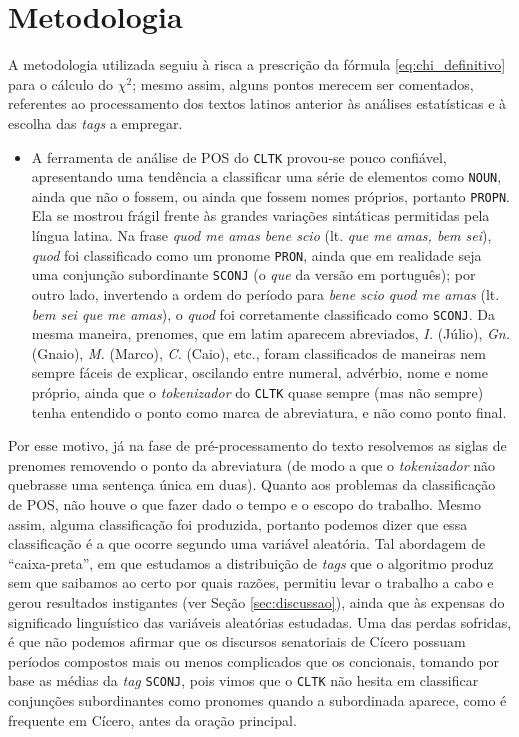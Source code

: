 \documentclass[10pt,a4paper,onecolumn]{article}
\theoremstyle{definition}
\theoremstyle{remark}
\begin{document}
\section{Metodologia}\label{sec:metodologia}
A metodologia utilizada seguiu à risca a prescrição da fórmula \eqref{eq:chi_definitivo} para o cálculo do $\chi^2$; mesmo assim, alguns pontos merecem ser comentados, referentes ao processamento dos textos latinos anterior às análises estatísticas e à escolha das \emph{tags} a empregar.

\begin{itemize}
	\item A ferramenta de análise de POS do \texttt{CLTK} provou-se pouco confiável, apresentando uma tendência a classificar uma série de elementos como \texttt{NOUN}, ainda que não o fossem, ou ainda que fossem nomes próprios, portanto \texttt{PROPN}. Ela se mostrou frágil frente às grandes variações sintáticas permitidas pela língua latina. Na frase \emph{quod me amas bene scio} (lt. \emph{que me amas, bem sei}), \emph{quod} foi classificado como um pronome \texttt{PRON}, ainda que em realidade seja uma conjunção subordinante \texttt{SCONJ} (o \emph{que} da versão em português); por outro lado, invertendo a ordem do período para \emph{bene scio quod me amas} (lt. \emph{bem sei que me amas}), o \emph{quod} foi corretamente classificado como \texttt{SCONJ}. Da mesma maneira, prenomes, que em latim aparecem abreviados, \emph{I.} (Júlio), \emph{Gn.} (Gnaio), \emph{M.} (Marco), \emph{C.} (Caio), etc., foram classificados de maneiras nem sempre fáceis de explicar, oscilando entre numeral, advérbio, nome e nome próprio, ainda que o \emph{tokenizador} do \texttt{CLTK} quase sempre (mas não sempre) tenha entendido o ponto como marca de abreviatura, e não como ponto final.   
\end{itemize}

Por esse motivo, já na fase de pré-processamento do texto resolvemos as siglas de prenomes removendo o ponto da abreviatura (de modo a que o \emph{tokenizador} não quebrasse uma sentença única em duas). Quanto aos problemas da classificação de POS, não houve o que fazer dado o tempo e o escopo do trabalho. Mesmo assim, alguma classificação foi produzida, portanto podemos dizer que essa classificação é a que ocorre segundo uma variável aleatória. Tal abordagem de ``caixa-preta'', em que estudamos a distribuição de \emph{tags} que o algoritmo produz sem que saibamos ao certo por quais razões, permitiu levar o trabalho a cabo e gerou resultados instigantes (ver Seção \ref{sec:discussao}), ainda que às expensas do significado linguístico das variáveis aleatórias estudadas. Uma das perdas sofridas, é que não podemos afirmar que os discursos senatoriais de Cícero possuam períodos compostos mais ou menos complicados que os concionais, tomando por base as médias da \emph{tag} \texttt{SCONJ}, pois vimos que o \texttt{CLTK} não hesita em classificar conjunções subordinantes como pronomes quando a subordinada aparece, como é frequente em Cícero, antes da oração principal.
\end{document}
